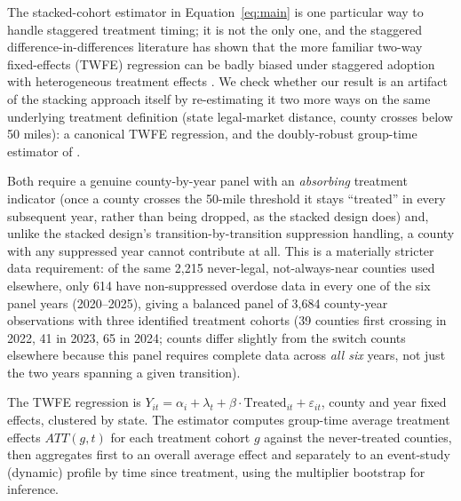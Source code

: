 \documentclass[11pt]{article}
\begin{document}
The stacked-cohort estimator in Equation~\ref{eq:main} is one
particular way to handle staggered treatment timing; it is not the
only one, and the staggered difference-in-differences literature has
shown that the more familiar two-way fixed-effects (TWFE) regression
can be badly biased under staggered adoption with heterogeneous
treatment effects \citep{GoodmanBacon2021}. We check whether our
result is an artifact of the stacking approach itself by re-estimating
it two more ways on the same underlying treatment definition (state
legal-market distance, county crosses below 50 miles): a canonical
TWFE regression, and the doubly-robust group-time estimator of
\citet{CallawaySantAnna2021}.

Both require a genuine county-by-year panel with an \emph{absorbing}
treatment indicator (once a county crosses the 50-mile threshold it
stays ``treated'' in every subsequent year, rather than being dropped,
as the stacked design does) and, unlike the stacked design's
transition-by-transition suppression handling, a county with any
suppressed year cannot contribute at all. This is a materially
stricter data requirement: of the same 2,215 never-legal, not-always-near
counties used elsewhere, only 614 have non-suppressed overdose data in
every one of the six panel years (2020--2025), giving a balanced panel
of 3,684 county-year observations with three identified treatment
cohorts (39 counties first crossing in 2022, 41 in 2023, 65 in 2024;
counts differ slightly from the switch counts elsewhere because this
panel requires complete data across \emph{all six} years, not just the
two years spanning a given transition).

The TWFE regression is $Y_{it} = \alpha_i + \lambda_t + \beta \cdot
\text{Treated}_{it} + \varepsilon_{it}$, county and year fixed effects,
clustered by state. The \citet{CallawaySantAnna2021} estimator computes
group-time average treatment effects $ATT(g,t)$ for each treatment
cohort $g$ against the never-treated counties, then aggregates first to
an overall average effect and separately to an event-study (dynamic)
profile by time since treatment, using the multiplier bootstrap for
inference.
\end{document}
